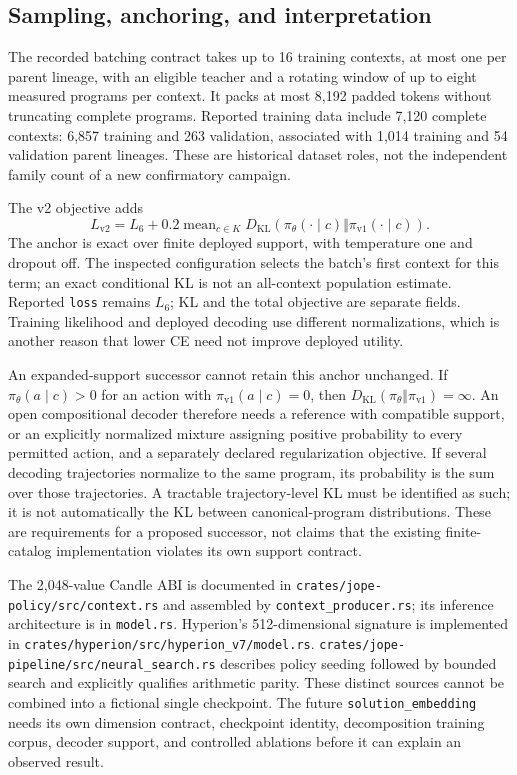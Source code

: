 \subsection{Sampling, anchoring, and interpretation}

The recorded batching contract takes up to 16 training contexts, at most one per
parent lineage, with an eligible teacher and a rotating window of up to eight
measured programs per context. It packs at most 8,192 padded tokens without
truncating complete programs. Reported training data include 7,120 complete
contexts: 6,857 training and 263 validation, associated with 1,014 training and
54 validation parent lineages. These are historical dataset roles, not the
independent family count of a new confirmatory campaign.

The v2 objective adds
\begin{equation}
 L_{\mathrm{v2}}=L_6+
 0.2\operatorname{mean}_{c\in K}
 D_{\mathrm{KL}}(\pi_\theta(\cdot\mid c)\Vert\pi_{\mathrm{v1}}(\cdot\mid c)).
\end{equation}
The anchor is exact over finite deployed support, with temperature one and
dropout off. The inspected configuration selects the batch's first context for
this term; an exact conditional KL is not an all-context population estimate.
Reported \texttt{loss} remains $L_6$; KL and the total objective are separate
fields. Training likelihood and deployed decoding use different normalizations,
which is another reason that lower CE need not improve deployed utility.

An expanded-support successor cannot retain this anchor unchanged. If
$\pi_\theta(a\mid c)>0$ for an action with
$\pi_{\mathrm{v1}}(a\mid c)=0$, then
$D_{\mathrm{KL}}(\pi_\theta\Vert\pi_{\mathrm{v1}})=\infty$.
An open compositional decoder therefore needs a reference with compatible
support, or an explicitly normalized mixture assigning positive probability
to every permitted action, and a separately declared regularization objective.
If several decoding trajectories normalize to the same program, its probability
is the sum over those trajectories. A tractable trajectory-level KL must be
identified as such; it is not automatically the KL between canonical-program
distributions. These are requirements for a proposed successor, not claims that
the existing finite-catalog implementation violates its own support contract.

The 2,048-value Candle ABI is documented in
\nolinkurl{crates/jope-policy/src/context.rs} and assembled by
\texttt{context\_producer.rs}; its inference architecture is in
\texttt{model.rs}. Hyperion's 512-dimensional signature is implemented in
\nolinkurl{crates/hyperion/src/hyperion_v7/model.rs}.
\nolinkurl{crates/jope-pipeline/src/neural_search.rs} describes policy seeding
followed by bounded search and explicitly qualifies arithmetic parity.
These distinct sources cannot be combined into a fictional single checkpoint.
The future \texttt{solution\_embedding} needs its own dimension contract,
checkpoint identity, decomposition training corpus, decoder support, and
controlled ablations before it can explain an observed result.

